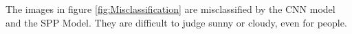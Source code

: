 The images in figure \ref{fig:Misclassification} are misclassified by the CNN model and the SPP Model. They are difficult to judge sunny or cloudy, even for people.
\graphicspath{ {./Figures/} }
\begin{figure}[htb]
    \centering
\end{figure}
